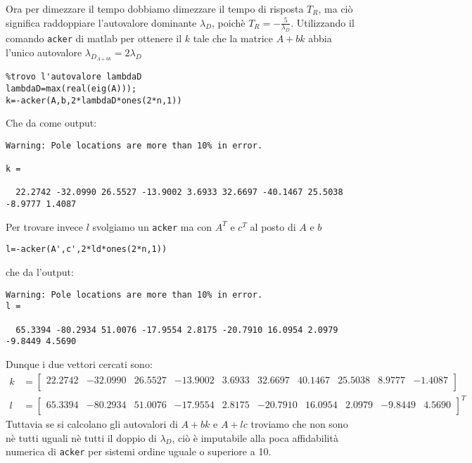 \documentclass[a4paper]{report}
\begin{document}
Ora per dimezzare il tempo dobbiamo dimezzare il tempo di risposta $T_R$, 
ma ciò significa raddoppiare l'autovalore dominante $\lambda_D$, poichè
$T_R=-\frac{5}{\lambda_D}$. Utilizzando il comando \verb|acker| di matlab
per ottenere il $k$ tale che la matrice $A+bk$ abbia l'unico autovalore 
$\lambda_{D_{A+bk}} = 2\lambda_D$
\begin{verbatim}
%trovo l'autovalore lambdaD
lambdaD=max(real(eig(A)));
k=-acker(A,b,2*lambdaD*ones(2*n,1))
\end{verbatim}
Che da come output:
\begin{verbatim}
Warning: Pole locations are more than 10% in error.

k =
  
  22.2742 -32.0990 26.5527 -13.9002 3.6933 32.6697 -40.1467 25.5038 -8.9777 1.4087
\end{verbatim}
Per trovare invece $l$ svolgiamo un \verb|acker| ma con $A^T$ e $c^T$ al posto di $A$ e $b$
\begin{verbatim}
l=-acker(A',c',2*ld*ones(2*n,1))
\end{verbatim}
che da l'output:
\begin{verbatim}
Warning: Pole locations are more than 10% in error.
l =

  65.3394 -80.2934 51.0076 -17.9554 2.8175 -20.7910 16.0954 2.0979 -9.8449 4.5690

\end{verbatim}
Dunque i due vettori cercati sono:
\begin{align*}
k&=\begin{bmatrix}
22.2742 &-32.0990 &26.5527 &-13.9002 &3.6933 &32.6697 &40.1467 &25.5038 &8.9777 &-1.4087\\
\end{bmatrix}\\
l&=\begin{bmatrix}
65.3394 &-80.2934 &51.0076 &-17.9554 &2.8175 &-20.7910 &16.0954 &2.0979 &-9.8449 &4.5690\\
\end{bmatrix}^T
\end{align*}
Tuttavia se si calcolano gli autovalori di $A+bk$ e $A+lc$ troviamo che non sono nè tutti uguali 
nè tutti il doppio di $\lambda_D$, ciò è imputabile alla poca affidabilità
numerica di \verb|acker| per sistemi ordine uguale o superiore a 10.
\end{document}

